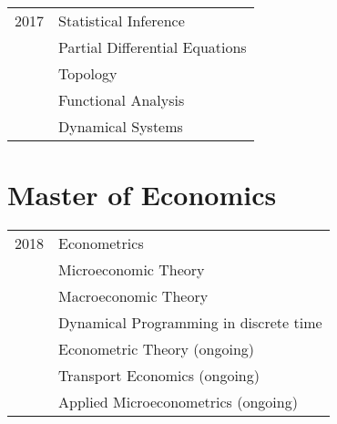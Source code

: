 \documentclass[a4paper,10pt]{article}
\begin{document}
\begin{tabular}{r|p{11cm}}
\textsc{2017}
 	&	Statistical Inference	\\
	&	Partial Differential Equations	\\
	&	Topology	\\
	&	Functional Analysis	\\
	&	Dynamical Systems	\\
\end{tabular}

\section{Master of Economics}

\begin{tabular}{r|p{11cm}}
\textsc{2018}
 	&	Econometrics	\\
	&	Microeconomic Theory	\\
	&	Macroeconomic Theory	\\
	&	Dynamical Programming in discrete time	\\
	&	Econometric Theory (ongoing)	\\
	&	Transport Economics	(ongoing)	\\
	&	Applied Microeconometrics (ongoing)
\end{tabular}
\end{document}
